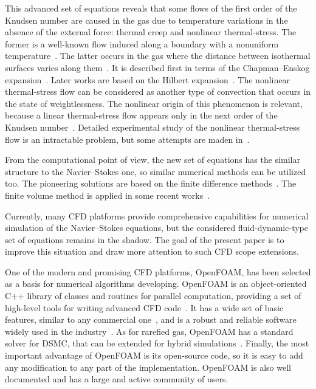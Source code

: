 \documentclass[smallextended, referee]{svjour3} %
\begin{document}
This advanced set of equations reveals that some flows of the first order of the Knudsen number
are caused in the gas due to temperature variations in the absence of the external force:
thermal creep and nonlinear thermal-stress. The former is a well-known flow induced along a boundary
with a nonuniform temperature~\cite{Maxwell1879Stresses, Ohwada1989Creep}.
The latter occurs in the gas where the distance between isothermal surfaces varies along them~\cite{Kogan1976}.
It is described first in terms of the Chapman--Enskog expansion~\cite{Kogan1971}.
Later works are based on the Hilbert expansion~\cite{SoneBobylev96}.
The nonlinear thermal-stress flow can be considered as another type of convection
that occurs in the state of weightlessness.
The nonlinear origin of this phenomenon is relevant, because a linear thermal-stress flow
appears only in the next order of the Knudsen number~\cite{Sone1972Stress}.
Detailed experimental study of the nonlinear thermal-stress flow is an intractable problem,
but some attempts are maden in~\cite{ExperimentsNTFS2003}.

From the computational point of view, the new set of equations has the similar structure
to the Navier--Stokes one, so similar numerical methods can be utilized too.
The pioneering solutions are based on the finite difference methods~\cite{SoneBobylev96, Kogan1976}.
The finite volume method is applied in some recent works~\cite{Laneryd2006, Laneryd2007}.

Currently, many CFD platforms provide comprehensive
capabilities for numerical simulation of the Navier--Stokes equations,
but the considered fluid-dynamic-type set of equations remains in the shadow.
The goal of the present paper is to improve this situation and
draw more attention to such CFD scope extensions.

One of the modern and promising CFD platforms, OpenFOAM\textregistered{},
has been selected as a basis for numerical algorithms developing.
OpenFOAM\textregistered{} is an object-oriented C++ library of classes and routines for parallel computation,
providing a set of high-level tools for writing advanced CFD code~\cite{OpenFOAM1998}.
It has a wide set of basic features, similar to any commercial one~\cite{OpenFOAM2010},
and is a robust and reliable software widely used in the industry~\cite{BoilingFlows2009,
TurbulentCombustion2011, CoastalEngineering2013, BiomassPyrolysis2013}.
As for rarefied gas, OpenFOAM\textregistered{} has a standard solver for DSMC, that
can be extended for hybrid simulations~\cite{HybridSolver2014}.
Finally, the most important advantage of OpenFOAM\textregistered{} is its open-source code,
so it is easy to add any modification to any part of the implementation.
OpenFOAM\textregistered{} is also well documented and has a large and active community of users.
\end{document}
